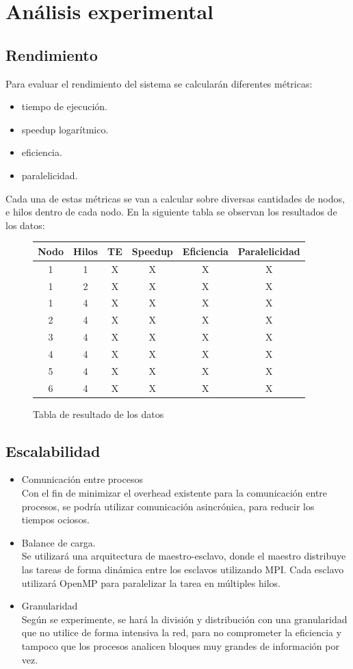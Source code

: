 \documentclass[journal]{IEEEtran}
\begin{document}
\section{Análisis experimental}
\subsection{Rendimiento}
Para evaluar el rendimiento del sistema se calcularán diferentes métricas:
\begin{itemize}
\item tiempo de ejecución.
\item speedup logarítmico.
\item eficiencia.
\item paralelicidad.
\end{itemize}
Cada una de estas métricas se van a calcular sobre diversas cantidades de nodos, e hilos dentro de cada nodo. En la siguiente tabla se observan los resultados de los datos: 

\begin{figure}
\begin{tabular}{ |c|c|c|c|c|c| } 
\hline
Nodo & Hilos & TE & Speedup & Eficiencia & Paralelicidad \\
\hline
1 & 1 & X & X & X  & X \\
\hline
1 & 2 & X & X & X  & X \\
\hline
1 & 4 & X & X & X  & X \\
\hline
2 & 4 & X & X & X  & X \\
\hline
3 & 4 & X & X & X  & X \\
\hline
4 & 4 & X & X & X  & X \\
\hline
5 & 4 & X & X & X  & X \\
\hline
6 & 4 & X & X & X  & X \\
\hline
\end{tabular}
\caption{Tabla de resultado de los datos}
\end{figure}

\subsection{Escalabilidad}
\begin{itemize}
\item Comunicación entre procesos\\
Con el fin de minimizar el overhead existente para la comunicación entre procesos, se podría utilizar comunicación asincrónica, para reducir los tiempos ociosos. 
\item Balance de carga.\\
Se utilizará una arquitectura de maestro-esclavo, donde el maestro distribuye las tareas de forma dinámica entre los esclavos utilizando MPI. Cada esclavo utilizará OpenMP para paralelizar la tarea en múltiples hilos. 
\item Granularidad\\
Según se experimente, se hará la división y distribución con una granularidad que no utilice de forma intensiva la red, para no comprometer la eficiencia y tampoco que los procesos analicen bloques muy grandes de información por vez.
\end{itemize}
\end{document}
